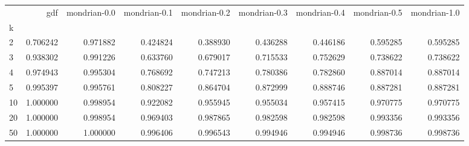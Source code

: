 \begin{tabular}{lrrrrrrrr}
\toprule
{} &       gdf &  mondrian-0.0 &  mondrian-0.1 &  mondrian-0.2 &  mondrian-0.3 &  mondrian-0.4 &  mondrian-0.5 &  mondrian-1.0 \\
k  &           &               &               &               &               &               &               &               \\
\midrule
2  &  0.706242 &      0.971882 &      0.424824 &      0.388930 &      0.436288 &      0.446186 &      0.595285 &      0.595285 \\
3  &  0.938302 &      0.991226 &      0.633760 &      0.679017 &      0.715533 &      0.752629 &      0.738622 &      0.738622 \\
4  &  0.974943 &      0.995304 &      0.768692 &      0.747213 &      0.780386 &      0.782860 &      0.887014 &      0.887014 \\
5  &  0.995397 &      0.995761 &      0.808227 &      0.864704 &      0.872999 &      0.888746 &      0.887281 &      0.887281 \\
10 &  1.000000 &      0.998954 &      0.922082 &      0.955945 &      0.955034 &      0.957415 &      0.970775 &      0.970775 \\
20 &  1.000000 &      0.998954 &      0.969403 &      0.987865 &      0.982598 &      0.982598 &      0.993356 &      0.993356 \\
50 &  1.000000 &      1.000000 &      0.996406 &      0.996543 &      0.994946 &      0.994946 &      0.998736 &      0.998736 \\
\bottomrule
\end{tabular}
